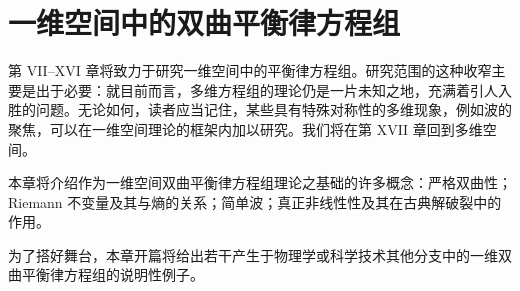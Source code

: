 \documentclass[../main.tex]{subfiles}
\begin{document}
\chapter{一维空间中的双曲平衡律方程组}\label{chapter:ch07-一维双曲平衡律组}

第 VII--XVI 章将致力于研究一维空间中的平衡律方程组。研究范围的这种收窄主要是出于必要：就目前而言，多维方程组的理论仍是一片未知之地，充满着引人入胜的问题。无论如何，读者应当记住，某些具有特殊对称性的多维现象，例如波的聚焦，可以在一维空间理论的框架内加以研究。我们将在第 XVII 章回到多维空间。


本章将介绍作为一维空间双曲平衡律方程组理论之基础的许多概念：严格双曲性；Riemann 不变量及其与熵的关系；简单波；真正非线性性及其在古典解破裂中的作用。

为了搭好舞台，本章开篇将给出若干产生于物理学或科学技术其他分支中的一维双曲平衡律方程组的说明性例子。











\end{document}
